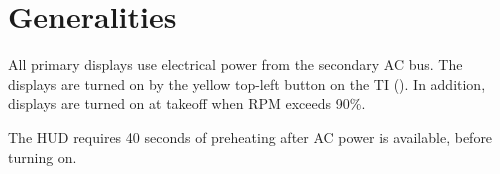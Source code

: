 \section{Generalities}
All primary displays use electrical power from the secondary AC bus.
The displays are turned on by the yellow top-left button on the TI
().
In addition, displays are turned on at takeoff when RPM exceeds 90\%.

The HUD requires 40 seconds of preheating after AC power is available, before turning on.
